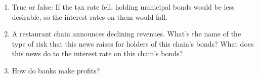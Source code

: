 \documentclass{article}
\begin{document}
\begin{enumerate}
\item True or false: If the tax rate fell, holding municipal bonds would be less desirable, so the interest rates on them would fall.

\item A restaurant chain announces declining revenues. What's the name of the type of risk that this news raises for holders of this chain's bonds? What does this news do to the interest rate on this chain's bonds?

\item How do banks make profits?

\end{enumerate}
\end{document}
